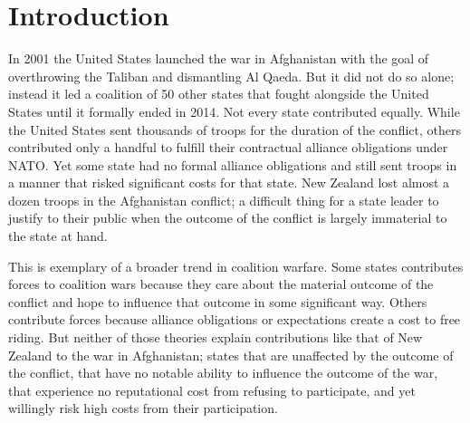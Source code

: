 \documentclass[12pt,letterpaper]{article}
\begin{document}
\doublespacing
\section{Introduction}
	In 2001 the United States launched the war in Afghanistan with the goal of overthrowing the Taliban and dismantling Al Qaeda. But it did not do so alone; instead it led a coalition of 50 other states that fought alongside the United States until it formally ended in 2014. Not every state contributed equally. While the United States sent thousands of troops for the duration of the conflict, others contributed only a handful to fulfill their contractual alliance obligations under NATO. Yet some state had no formal alliance obligations and still sent troops in a manner that risked significant costs for that state. New Zealand lost almost a dozen troops in the Afghanistan conflict; a difficult thing for a state leader to justify to their public when the outcome of the conflict is largely immaterial to the state at hand.

	This is exemplary of a broader trend in coalition warfare. Some states contributes forces to coalition wars because they care about the material outcome of the conflict and hope to influence that outcome in some significant way. Others contribute forces because alliance obligations or expectations create a cost to free riding. But neither of those theories explain contributions like that of New Zealand to the war in Afghanistan; states that are unaffected by the outcome of the conflict, that have no notable ability to influence the outcome of the war, that experience no reputational cost from refusing to participate, and yet willingly risk high costs from their participation.
\end{document}
